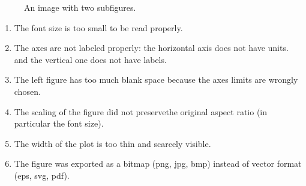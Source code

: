 \documentclass[a4paper, twoside]{report}
\theoremstyle{definition}
\numberwithin{equation}{section}
\begin{document}
\begin{figure}[htbp]
  \centering
  \caption{An image with two subfigures.}
  \label{fig:fig2}
\end{figure}

\begin{enumerate}
  \item The font size is too small to be read properly.
  \item The axes are not labeled properly: the horizontal axis does not have units. and the vertical one does not have labels.
  \item The left figure has too much blank space because the axes limits are wrongly chosen.
  \item The scaling of the figure did not preservethe original aspect ratio (in particular the font size).
  \item The width of the plot is too thin and scarcely visible.
  \item The figure was exported as a bitmap (png, jpg, bmp) instead of vector format (eps, svg, pdf).
\end{enumerate}
\end{document}
